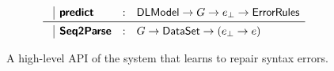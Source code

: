 \begin{figure}[t]
\begin{minipage}[t]{0.61\linewidth}
\[{\begin{array}{c|lcl}
                                                  & \predictsym    & : & \Model \to G \to e_{\bot} \to \errorrulessym \\
                                                    \midrule
                                                  & \systemsym     & : & G \to \datasetsym \to (e_{\bot} \to e) \\
  \end{array}
  }
  \]
  \lstMakeShortInline[language=Python, mathescape=true]{|}
\end{minipage}
\caption{A high-level API of the \toolname system that learns to repair syntax
errors.}
\label{fig:api}
\end{figure}
